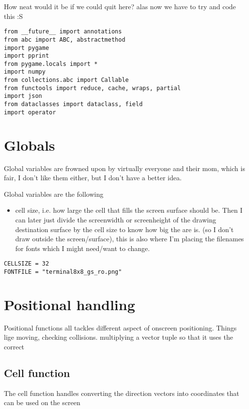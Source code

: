 \documentclass[11pt]{article}
\begin{document}
How neat would it be if we could quit here? alas now we have to try and code this :S 




\begin{verbatim}
from __future__ import annotations
from abc import ABC, abstractmethod
import pygame
import pprint
from pygame.locals import *
import numpy
from collections.abc import Callable
from functools import reduce, cache, wraps, partial
import json
from dataclasses import dataclass, field
import operator
\end{verbatim}

\section{Globals}
\label{sec:orgee6c466}

Global variables are frowned upon by virtually everyone and their mom, which is fair, I don't like them either, but I don't have a better idea.

Global variables are the following
\begin{itemize}
\item cell size, i.e. how large the cell that fills the screen surface should be. Then I can later just divide the screenwidth or screenheight of the drawing destination surface by the cell size to know how big the are is. (so I don't draw outside the screen/surface), this is also where I'm placing the filenames for fonts which I might need/want to change.
\end{itemize}


\begin{verbatim}
CELLSIZE = 32
FONTFILE = "terminal8x8_gs_ro.png"
\end{verbatim}


\section{Positional handling}
\label{sec:orge7cc6b4}

Positional functions all tackles different aspect of onscreen positioning. Things lige moving, checking collisions. multiplying a vector tuple so that it uses the correct 

\subsection{Cell function}
\label{sec:org3daac51}

The cell function handles converting the direction vectors into coordinates that can be used on the screen
\end{document}
